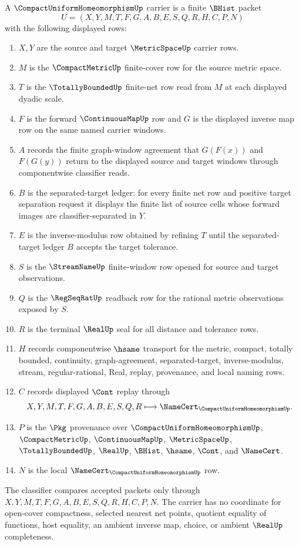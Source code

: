 \begin{definition}\label{def:compact-uniform-homeomorphism-carrier}
A $\CompactUniformHomeomorphismUp$ carrier is a finite $\BHist$ packet
$$
U=(X,Y,M,T,F,G,A,B,E,S,Q,R,H,C,P,N)
$$
with the following displayed rows:
\begin{enumerate}
\item $X,Y$ are the source and target $\MetricSpaceUp$ carrier rows.
\item $M$ is the $\CompactMetricUp$ finite-cover row for the source metric space.
\item $T$ is the $\TotallyBoundedUp$ finite-net row read from $M$ at each displayed dyadic scale.
\item $F$ is the forward $\ContinuousMapUp$ row and $G$ is the displayed inverse map row on the same named carrier windows.
\item $A$ records the finite graph-window agreement that $G(F(x))$ and $F(G(y))$ return to the displayed source and target windows through componentwise classifier reads.
\item $B$ is the separated-target ledger: for every finite net row and positive target separation request it displays the finite list of source cells whose forward images are classifier-separated in $Y$.
\item $E$ is the inverse-modulus row obtained by refining $T$ until the separated-target ledger $B$ accepts the target tolerance.
\item $S$ is the $\StreamNameUp$ finite-window row opened for source and target observations.
\item $Q$ is the $\RegSeqRatUp$ readback row for the rational metric observations exposed by $S$.
\item $R$ is the terminal $\RealUp$ seal for all distance and tolerance rows.
\item $H$ records componentwise $\hsame$ transport for the metric, compact, totally bounded, continuity, graph-agreement, separated-target, inverse-modulus, stream, regular-rational, Real, replay, provenance, and local naming rows.
\item $C$ records displayed $\Cont$ replay through
$$
X,Y,M,T,F,G,A,B,E,S,Q,R \longmapsto \NameCert_{\CompactUniformHomeomorphismUp}.
$$
\item $P$ is the $\Pkg$ provenance over $\CompactUniformHomeomorphismUp$, $\CompactMetricUp$, $\ContinuousMapUp$, $\MetricSpaceUp$, $\TotallyBoundedUp$, $\RealUp$, $\BHist$, $\hsame$, $\Cont$, and $\NameCert$.
\item $N$ is the local $\NameCert_{\CompactUniformHomeomorphismUp}$ row.
\end{enumerate}
The classifier compares accepted packets only through $X,Y,M,T,F,G,A,B,E,S,Q,R,H,C,P,N$. The carrier has no coordinate for open-cover compactness, selected nearest net points, quotient equality of functions, host equality, an ambient inverse map, choice, or ambient $\RealUp$ completeness.
\end{definition}

